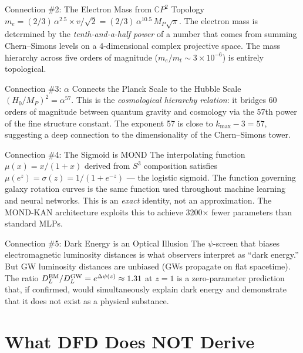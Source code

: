 \documentclass[12pt,a4paper]{article}
\newcommand{\CP}{\mathbb{C}P}
\begin{document}
\begin{surprisebox}{Connection \#2: The Electron Mass from $\CP^2$ Topology}
$m_e = (2/3)\,\alpha^{2.5} \times v/\sqrt{2}
= (2/3)\,\alpha^{10.5}\,M_P\sqrt{\pi}$.
The electron mass is determined by the \textit{tenth-and-a-half power}
of a number that comes from summing Chern--Simons levels on a
4-dimensional complex projective space.  The mass hierarchy across five
orders of magnitude ($m_e/m_t \sim 3 \times 10^{-6}$) is entirely
topological.
\end{surprisebox}

\begin{surprisebox}{Connection \#3: $\alpha$ Connects the Planck Scale to the Hubble Scale}
$(H_0/M_P)^2 = \alpha^{57}$.  This is the \textit{cosmological hierarchy
relation}: it bridges 60 orders of magnitude between quantum gravity
and cosmology via the 57th power of the fine structure constant.
The exponent 57 is close to $k_{\max} - 3 = 57$, suggesting a deep
connection to the dimensionality of the Chern--Simons tower.
\end{surprisebox}

\begin{surprisebox}{Connection \#4: The Sigmoid is MOND}
The interpolating function $\mu(x) = x/(1+x)$ derived from $S^3$
composition satisfies $\mu(e^z) = \sigma(z) = 1/(1+e^{-z})$ ---
the logistic sigmoid.  The function governing galaxy rotation curves
is the same function used throughout machine learning and neural networks.
This is an \textit{exact} identity, not an approximation.
The MOND-KAN architecture exploits this to achieve 3200$\times$ fewer
parameters than standard MLPs.
\end{surprisebox}

\begin{surprisebox}{Connection \#5: Dark Energy is an Optical Illusion}
The $\psi$-screen that biases electromagnetic luminosity distances
is what observers interpret as ``dark energy.''  But GW luminosity
distances are unbiased (GWs propagate on flat spacetime).  The ratio
$D_L^{\rm EM}/D_L^{\rm GW} = e^{\Delta\psi(z)} \approx 1.31$ at $z=1$
is a zero-parameter prediction that, if confirmed, would simultaneously
explain dark energy and demonstrate that it does not exist as a physical
substance.
\end{surprisebox}

\section{What DFD Does NOT Derive}
\label{sec:honest}
\end{document}

